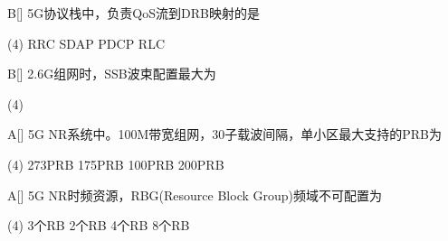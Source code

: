 \begin{choice}{B}[]
    5G协议栈中，负责QoS流到DRB映射的是
    \begin{tasks}(4)
        \task RRC
        \task SDAP
        \task PDCP
        \task RLC
    \end{tasks}
\end{choice}


\begin{choice}{B}[]
    2.6G组网时，SSB波束配置最大为
    \begin{tasks}(4)
    \end{tasks}
\end{choice}


\begin{choice}{A}[]
    5G NR系统中。100M带宽组网，30子载波间隔，单小区最大支持的PRB为
    \begin{tasks}(4)
        \task 273PRB
        \task 175PRB
        \task 100PRB
        \task 200PRB
    \end{tasks}
\end{choice}

\begin{choice}{A}[]
    5G NR时频资源，RBG(Resource Block Group)频域不可配置为
    \begin{tasks}(4)
        \task 3个RB
        \task 2个RB
        \task 4个RB
        \task 8个RB
    \end{tasks}
\end{choice}


